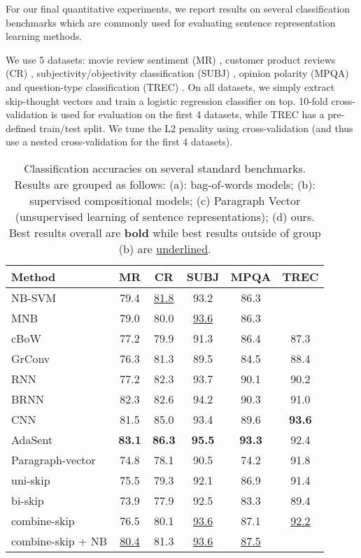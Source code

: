 \documentclass{article} \usepackage{nips15submit_e,times}
\begin{document}
For our final quantitative experiments, we report results on several classification benchmarks which are commonly used for evaluating sentence representation learning methods. 

We use 5 datasets: movie review sentiment (MR) \cite{pang2005seeing}, customer product reviews (CR) \cite{hu2004mining}, subjectivity/objectivity  classification (SUBJ) \cite{pang2004sentimental}, opinion polarity (MPQA) \cite{wiebe2005annotating} and question-type classification (TREC) \cite{li2002learning}. On all datasets, we simply extract skip-thought vectors and train a logistic regression classifier on top. 10-fold cross-validation is used for evaluation on the first 4 datasets, while TREC has a pre-defined train/test split. We tune the L2 penality using cross-validation (and thus use a nested cross-validation for the first 4 datasets). 

\begin{wraptable}{l}{8cm}
\scriptsize
\centering
\begin{tabular}{lccccc}
\toprule \bf Method & \bf MR & \bf CR & \bf SUBJ & \bf MPQA & \bf TREC  \\ \midrule
NB-SVM \cite{wang2012baselines} & 79.4 & \underline{81.8} & 93.2 & 86.3 &  \\
MNB \cite{wang2012baselines} & 79.0 & 80.0 & \underline{93.6} & 86.3 &  \\
cBoW \cite{zhao2015self} & 77.2 & 79.9 & 91.3 & 86.4 & 87.3 \\ \midrule
GrConv \cite{zhao2015self} & 76.3 & 81.3 & 89.5 & 84.5 & 88.4 \\
RNN \cite{zhao2015self} & 77.2 & 82.3 & 93.7 & 90.1 & 90.2 \\
BRNN \cite{zhao2015self} & 82.3 & 82.6 & 94.2 & 90.3 & 91.0 \\
CNN \cite{kim2014convolutional} & 81.5 & 85.0 & 93.4 & 89.6 & {\bf 93.6} \\
AdaSent \cite{zhao2015self} & {\bf 83.1} & {\bf 86.3} & {\bf 95.5} & {\bf 93.3} & 92.4 \\ \midrule
Paragraph-vector \cite{le2014distributed} & 74.8 & 78.1 & 90.5 & 74.2 & 91.8 \\ \midrule
uni-skip   & 75.5 & 79.3 & 92.1 & 86.9 & 91.4 \\
bi-skip & 73.9 & 77.9 & 92.5 & 83.3 & 89.4 \\
combine-skip & 76.5 & 80.1 & \underline{93.6} & 87.1 & \underline{92.2} \\
combine-skip + NB & \underline{80.4} & 81.3 & \underline{93.6} & \underline{87.5} &  \\ \bottomrule
\end{tabular}
\caption{\small{Classification accuracies on several standard benchmarks. Results are grouped as follows: (a): bag-of-words models; (b): supervised compositional models; (c) Paragraph Vector (unsupervised learning of sentence representations); (d) ours. Best results overall are {\bf bold} while best results outside of group (b) are \underline{ underlined}.} }
\label{tab:classification}
\vspace{-5mm}
\end{wraptable}
\end{document}
